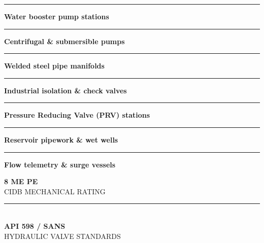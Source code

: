 \begin{minipage}[t]{0.34\textwidth}
    \vspace{0pt}
    \begin{tcolorbox}[
        enhanced, colback=mhoffwhite, colframe=mhnavy, boxrule=1pt, arc=4pt,
        title={\bfseries\color{white}\faCogs\ Mechanical Scope of Work},
        colbacktitle=mhnavy, left=7pt, right=7pt, top=6pt, bottom=6pt,
        drop shadow=black!6
    ]
        \fontsize{8.1pt}{11.6pt}\selectfont
        \textcolor{mhnavy}{\rule{4pt}{4pt}}\hspace{4pt}\textbf{Water booster pump stations}\\
        \textcolor{mhnavy}{\rule{4pt}{4pt}}\hspace{4pt}\textbf{Centrifugal \& submersible pumps}\\
        \textcolor{mhnavy}{\rule{4pt}{4pt}}\hspace{4pt}\textbf{Welded steel pipe manifolds}\\
        \textcolor{mhnavy}{\rule{4pt}{4pt}}\hspace{4pt}\textbf{Industrial isolation \& check valves}\\
        \textcolor{mhnavy}{\rule{4pt}{4pt}}\hspace{4pt}\textbf{Pressure Reducing Valve (PRV) stations}\\
        \textcolor{mhnavy}{\rule{4pt}{4pt}}\hspace{4pt}\textbf{Reservoir pipework \& wet wells}\\
        \textcolor{mhnavy}{\rule{4pt}{4pt}}\hspace{4pt}\textbf{Flow telemetry \& surge vessels}
    \end{tcolorbox}

    \vspace{0.20cm}

    \begin{tcolorbox}[
        enhanced, colback=white, colframe=mhlightgray, boxrule=0.8pt, arc=4pt,
        left=6pt, right=6pt, top=6pt, bottom=6pt, halign=center,
        drop shadow=black!4
    ]
        {\fontsize{18pt}{20pt}\selectfont\bfseries\color{mhblue}8 ME PE}\\[1pt]
        {\fontsize{7.4pt}{9pt}\selectfont\color{mhtextmuted}\MakeUppercase{CIDB Mechanical Rating}}\\[4pt]
        \textcolor{mhlightgray}{\rule{3.2cm}{0.6pt}}\\[4pt]
        {\fontsize{13pt}{15pt}\selectfont\bfseries\color{mhnavy}API 598 / SANS}\\[1pt]
        {\fontsize{7.2pt}{9pt}\selectfont\color{mhtextmuted}\MakeUppercase{Hydraulic Valve Standards}}
    \end{tcolorbox}
\end{minipage}

